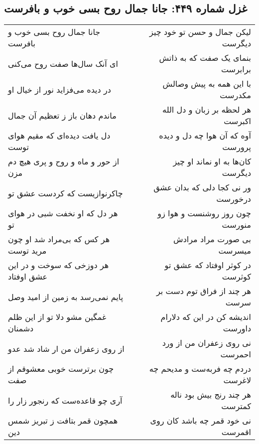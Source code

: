 \begin{center}
\section*{غزل شماره ۴۴۹: جانا جمال روح بسی خوب و بافرست}
\label{sec:0449}
\begin{longtable}{l p{0.5cm} r}
جانا جمال روح بسی خوب و بافرست
&&
لیکن جمال و حسن تو خود چیز دیگرست
\\
ای آنک سال‌ها صفت روح می‌کنی
&&
بنمای یک صفت که به ذاتش برابرست
\\
در دیده می‌فزاید نور از خیال او
&&
با این همه به پیش وصالش مکدرست
\\
ماندم دهان باز ز تعظیم آن جمال
&&
هر لحظه بر زبان و دل الله اکبرست
\\
دل یافت دیده‌ای که مقیم هوای توست
&&
آوه که آن هوا چه دل و دیده پرورست
\\
از حور و ماه و روح و پری هیچ دم مزن
&&
کان‌ها به او نماند او چیز دیگرست
\\
چاکرنوازیست که کردست عشق تو
&&
ور نی کجا دلی که بدان عشق درخورست
\\
هر دل که او نخفت شبی در هوای تو
&&
چون روز روشنست و هوا زو منورست
\\
هر کس که بی‌مراد شد او چون مرید توست
&&
بی صورت مراد مرادش میسرست
\\
هر دوزخی که سوخت و در این عشق اوفتاد
&&
در کوثر اوفتاد که عشق تو کوثرست
\\
پایم نمی‌رسد به زمین از امید وصل
&&
هر چند از فراق توم دست بر سرست
\\
غمگین مشو دلا تو از این ظلم دشمنان
&&
اندیشه کن در این که دلارام داورست
\\
از روی زعفران من ار شاد شد عدو
&&
نی روی زعفران من از ورد احمرست
\\
چون برترست خوبی معشوقم از صفت
&&
دردم چه فربه‌ست و مدیحم چه لاغرست
\\
آری چو قاعده‌ست که رنجور زار را
&&
هر چند رنج بیش بود ناله کمترست
\\
همچون قمر بتافت ز تبریز شمس دین
&&
نی خود قمر چه باشد کان روی اقمرست
\\
\end{longtable}
\end{center}

